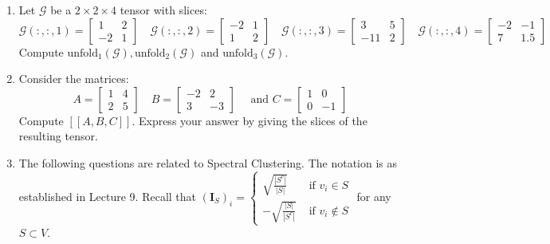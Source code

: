 \documentclass[10pt]{article}
\begin{document}
\begin{enumerate}
\item Let $\mathcal{G}$ be a $2\times 2\times 4$ tensor with slices:
$$
\mathcal{G}(:,:,1) = \left[\begin{matrix} 1 & 2 \\ -2 & 1 \end{matrix}\right] \quad \mathcal{G}(:,:,2) = \left[\begin{matrix} -2 & 1 \\ 1 & 2 \end{matrix}\right] \quad \mathcal{G}(:,:,3) = \left[\begin{matrix} 3 & 5 \\ -11 & 2 \end{matrix}\right] \quad \mathcal{G}(:,:,4) = \left[\begin{matrix} -2 & -1 \\ 7 & 1.5 \end{matrix}\right]
$$
Compute $\text{unfold}_1(\mathcal{G}), \text{unfold}_2(\mathcal{G})$ and $\text{unfold}_3(\mathcal{G})$. \\

\item Consider the matrices:
$$
A = \left[\begin{matrix} 1 & 4 \\ 2 & 5 \end{matrix}\right] \quad B = \left[\begin{matrix} -2 & 2 \\ 3 & -3 \end{matrix}\right] \quad \text{ and } C = \left[\begin{matrix} 1 & 0 \\ 0 & -1 \end{matrix}\right]
$$
Compute $[[A,B,C]]$. Express your answer by giving the slices of the resulting tensor.

\item The following questions are related to Spectral Clustering. The notation is as established in Lecture 9. Recall that  $\displaystyle \left(\mathbf{I}_{S}\right)_{i} = \left\{\begin{array}{cc} \sqrt{\frac{|S^{c}|}{|S|}} & \text{ if } v_i \in S \\ -\sqrt{\frac{|S|}{|S^{c}|}} & \text{ if } v_i \notin S \end{array}\right.$ for any $S\subset V$.  


\end{enumerate}
\end{document}
